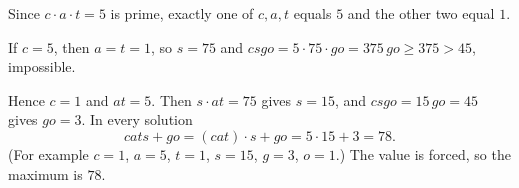 Since $c\cdot a\cdot t=5$ is prime, exactly one of $c,a,t$ equals $5$ and the other two equal $1$.

If $c=5$, then $a=t=1$, so $s=75$ and $csgo=5\cdot75\cdot go=375\,go\ge375>45$, impossible.

Hence $c=1$ and $at=5$. Then $s\cdot at=75$ gives $s=15$, and $csgo=15\,go=45$ gives $go=3$. In every solution
\[
cats+go=(cat)\cdot s+go=5\cdot15+3=78 .
\]
(For example $c=1$, $a=5$, $t=1$, $s=15$, $g=3$, $o=1$.) The value is forced, so the maximum is $\boxed{78}$.
